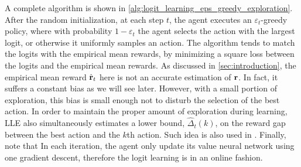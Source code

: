 A complete algorithm is shown in \cref{alg:logit_learning_eps_greedy_exploration}. 
After the random initialization, at each step $t$, the agent executes an $\varepsilon_t$-greedy policy, where with probability $1 - \varepsilon_t$ the agent selects the action with the largest logit, or otherwise it uniformly samples an action.
The algorithm tends to match the logits with the empirical mean rewards, by minimizing a square loss between the logits and the empirical mean rewards.
As discussed in \cref{sec:introduction}, the empirical mean reward $\hat{{\mathbf{r}}}_t$ here is not an accurate estimation of ${\mathbf{r}}$. In fact, it suffers a constant bias as we will see later.
However, with a small portion of exploration, this bias is small enough not to disturb the selection of the best action.
In order to maintain the proper amount of exploration during learning, 
LLE also simultaneously estimates a lower bound, $\hat{\Delta}_t(k)$, on the reward gap between the best action and the $k$th action. 
Such idea is also used in  \cite{seldin2017improved}.
Finally, note that In each iteration, the agent only update its value neural network using one gradient descent, therefore the logit learning is in an online fashion.

